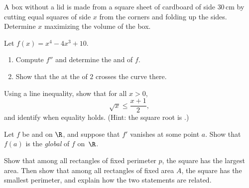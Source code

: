 \begin{exercise}[$\star\star$]\label{exo:g12:deriv:5}
A box without a lid is made from a square sheet of cardboard of side
$30\,$cm by cutting equal squares of side $x$ from the corners and folding up
the sides. Determine $x$ maximizing the volume of the box.
\end{exercise}

\begin{exercise}[$\star\star$]\label{exo:g12:deriv:6}
Let $f(x) = x^4 - 4x^3 + 10$.
\begin{enumerate}
  \item Compute $f''$ and determine the   and  of $f$.
  \item Show that the  at the  of  $2$
        crosses the curve there.
\end{enumerate}
\end{exercise}

\begin{exercise}[$\star\star$]\label{exo:g12:deriv:7}
Using a  line inequality, show that for all $x > 0$,
\[
\sqrt{x} \leq \frac{x + 1}{2},
\]
and identify when equality holds. (Hint: the square root is .)
\end{exercise}

\begin{exercise}[$\star\star\star$]\label{exo:g12:deriv:8}
Let $f$ be  and  on $\R$, and suppose that $f'$ vanishes
at some point $a$. Show that $f(a)$ is the \emph{global}  of $f$
on~$\R$.
\end{exercise}

\begin{exercise}[$\star\star\star$]\label{exo:g12:deriv:9}
Show that among all rectangles of fixed perimeter $p$, the square has the
largest area. Then show that among all rectangles of fixed area $A$, the
square has the smallest perimeter, and explain how the two statements are
related.
\end{exercise}
